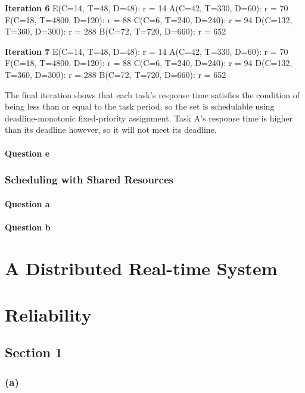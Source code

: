 \documentclass[]{report}
\begin{document}
			\textbf{Iteration 6}
			E(C=14, T=48, D=48): r = 14
			A(C=42, T=330, D=60): r = 70
			F(C=18, T=4800, D=120): r = 88
			C(C=6, T=240, D=240): r = 94
			D(C=132, T=360, D=300): r = 288
			B(C=72, T=720, D=660): r = 652


			\textbf{Iteration 7}
			E(C=14, T=48, D=48): r = 14
			A(C=42, T=330, D=60): r = 70
			F(C=18, T=4800, D=120): r = 88
			C(C=6, T=240, D=240): r = 94
			D(C=132, T=360, D=300): r = 288
			B(C=72, T=720, D=660): r = 652
		
			The final iteration shows that each task's response time satisfies the condition of being less than or equal to the task period, so the set is schedulable using deadline-monotonic fixed-priority assignment. Task A's response time is higher than its deadline however, so it will not meet its deadline.
			
			\subsubsection{Question e}
		
		\subsection{Scheduling with Shared Resources}
			\subsubsection{Question a}
			\subsubsection{Question b}
	
	\chapter{A Distributed Real-time System}
		
	
	
	\chapter{Reliability}
		\section{Section 1}
			\subsection{(a)}
\end{document}
